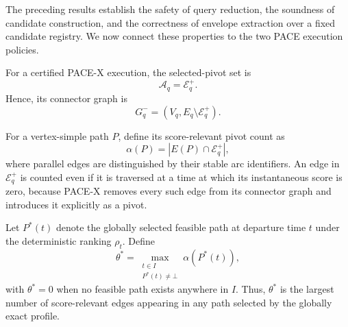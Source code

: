 \documentclass[a4paper,fleqn]{cas-dc}
\begin{document}
The preceding results establish the safety of query reduction, the soundness of
candidate construction, and the correctness of envelope extraction over a
fixed candidate registry. We now connect these properties to the two PACE
execution policies.

For a certified PACE-X execution, the selected-pivot set is
\[
\mathcal A_q=\mathcal E_q^{+}.
\]
Hence, its connector graph is
\[
G_q^{-}
=
(V_q,E_q\setminus\mathcal E_q^{+}).
\]

For a vertex-simple path \(P\), define its score-relevant pivot count as
\[
\alpha(P)
=
\left|
E(P)\cap\mathcal{E}_q^{+}
\right|,
\]
where parallel edges are distinguished by their stable arc identifiers. An
edge in \(\mathcal{E}_q^{+}\) is counted even if it is traversed at a time at
which its instantaneous score is zero, because PACE-X removes every such edge
from its connector graph and introduces it explicitly as a pivot.

Let \(P^{*}(t)\) denote the globally selected feasible path at departure time
\(t\) under the deterministic ranking \(\rho_t\). Define
\[
\theta^{*}
=
\max_{\substack{
t\in I\\
P^{*}(t)\neq\bot
}}
\alpha(P^{*}(t)),
\]
with \(\theta^{*}=0\) when no feasible path exists anywhere in \(I\). Thus,
\(\theta^{*}\) is the largest number of score-relevant edges appearing in any
path selected by the globally exact profile.
\end{document}
